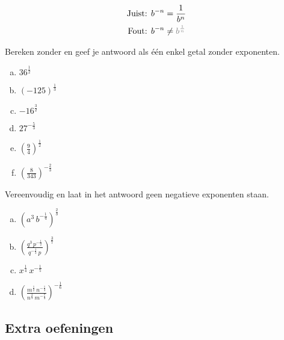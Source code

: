 \documentclass[12pt,twoside]{article}
\begin{document}
\begin{align*}
  \text{Juist: }b^{-n} &= \dfrac{1}{b^n}\\
  \text{Fout:  } b^{-n} &\neq \color{gray}{b^{\frac{1}{n}}}
\end{align*}

\begin{oefening}
  Bereken zonder  en geef je antwoord als één enkel getal zonder exponenten.
  \begin{multicols}{3}
    \begin{enumerate}[(a)]
      \itemsep1em
    \item $ {36^{\frac{1}{2}}}  $
    \item $ {\left( { - 125} \right)^{\frac{1}{3}}}  $
    \item $ - {16^{\frac{3}{2}}}  $
    \item $ {27^{ -\frac{5}{3}}}  $
    \item $ {\displaystyle \left( {\frac{9}{4}} \right)^{\frac{1}{2}}}  $
    \item $ {\displaystyle \left( {\frac{8}{{343}}} \right)^{ - \frac{2}{3}}}  $
    \end{enumerate}
  \end{multicols}
\end{oefening}


\begin{oefening}
  Vereenvoudig en laat in het antwoord geen negatieve exponenten staan.
  \begin{multicols}{2}
    \begin{enumerate}[(a)]
      \itemsep1em
    \item $ {\left( {{a^3}\,{b^{ - \frac{1}{4}}}} \right)^{\frac{2}{3}}}  $
    \item $ {\displaystyle \left( {\frac{{{q^3}\,{p^{ - \frac{1}{2}}}}}{{{q^{ - \frac{1}{3}}}\,p}}} \right)^{\frac{3}{7}}}  $
    \item $ {x^{\frac{1}{4}}}\,{x^{ - \frac{1}{5}}}  $
    \item $ {\displaystyle \left( {\frac{{{m^{\frac{1}{2}}}\,{n^{ - \frac{1}{3}}}}}{{{n^{\frac{2}{3}}}\,{m^{ - \frac{7}{4}}}}}} \right)^{ - \frac{1}{6}}}  $
    \end{enumerate}
  \end{multicols}
\end{oefening}

\subsection{Extra oefeningen}
\end{document}
